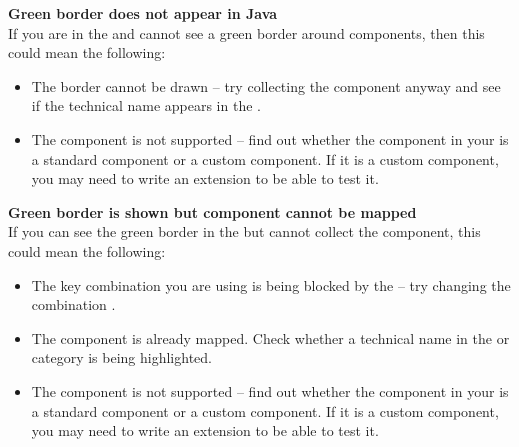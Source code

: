 % 
%
%


\textbf{Green border does not appear in Java \gdauts{}}\\
If you are in the \gdomm{}  and cannot see a green border around components, then this could mean the following:
\begin{itemize}
\item The border cannot be drawn -- try collecting the component anyway and see if the technical name appears in the \gdomeditor{}. 
\item The component is not supported -- find out whether the component in your \gdaut{} is a standard component or a custom component. If it is a custom component, you may need to write an extension to be able to test it. 
\end{itemize}

\textbf{Green border is shown but component cannot be mapped}\\
If you can see the green border in the \gdomm{} but cannot collect the component, this could mean the following:

\begin{itemize}
\item The key combination you are using is being blocked by the \gdaut{} -- try changing the combination .
\item The component is already mapped. Check whether a technical name in the  or  category is being highlighted.
\item The component is not supported -- find out whether the component in your \gdaut{} is a standard component or a custom component. If it is a custom component, you may need to write an extension to be able to test it.
\end{itemize}


